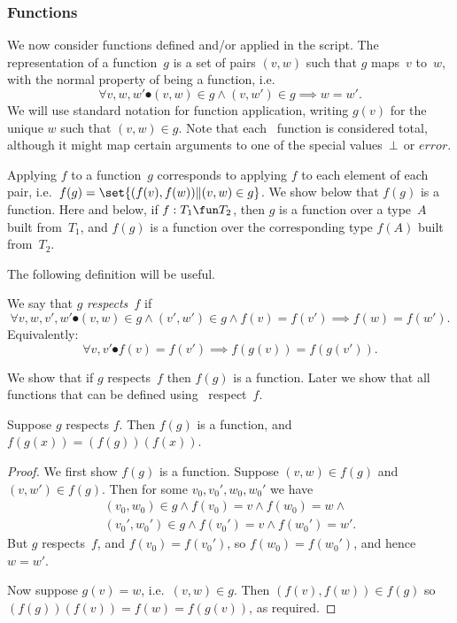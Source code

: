 \subsubsection{Functions}

We now consider functions defined and/or applied in the script.
The representation of a function~$g$ is a set of pairs $(v,w)$ such that $g$
maps~$v$ to~$w$, with the normal property of being a function, i.e.
\[
\forall v, w, w' \spot (v,w) \in g \land (v,w') \in g \implies w=w'.
\]
We will use standard notation for function application, writing $g(v)$ for the
unique $w$ such that $(v,w) \in g$.
%
Note that each \CSPm\ function is considered total, although it might map
certain arguments to one of the special values~$\perp$ or $error$. 

Applying $f$ to a function~$g$ corresponds to applying $f$ to each element of
each pair, i.e.~$f(g) = \set{(f(v), f(w)) \| (v,w) \in g}$.  We show below
that $f(g)$ is a function.  Here and below, if $f: T_1 \fun T_2$, then $g$ is
a function over a type~$A$ built from~$T_1$, and $f(g)$ is a function over the
corresponding type $f(A)$ built from~$T_2$.

The following definition will be useful.
%
\begin{definition}
We say that $g$ \emph{respects~$f$} if
\[
\forall v, w, v', w' \spot 
  (v,w) \in g \land (v',w') \in g \land f(v) = f(v') \implies f(w) = f(w'). 
\]
Equivalently:
\[
\forall v,  v' \spot f(v) = f(v') \implies f(g(v)) = f(g(v')). 
\]
\end{definition}
%
We show that if $g$ respects~$f$ then $f(g)$ is a function.  Later we show
that all functions that can be defined using \CSPm\ respect~$f$. 
%
\begin{lemma}
\label{lem:function-respects}
Suppose $g$ respects $f$.  Then $f(g)$ is a function, and $f(g(x)) =
(f(g))(f(x))$.
\end{lemma}
%
\begin{proof}
We first show $f(g)$ is a function.  Suppose $(v,w) \in f(g)$ and $(v,w') \in
f(g)$.  Then for some $v_0, v_0', w_0, w_0'$ we have
\[
\begin{align}
(v_0,w_0) \in g \land f(v_0) = v \land f(w_0) = w \land \\
(v_0',w_0') \in g \land f(v_0') = v \land f(w_0') = w'.
\end{align}
\]
But $g$ respects~$f$, and $f(v_0) = f(v_0')$, so $f(w_0) = f(w_0')$, and hence
$w = w'$.

Now suppose $g(v) = w$, i.e.~$(v,w) \in g$.  Then $(f(v),f(w)) \in f(g)$ so
$(f(g))(f(v)) = f(w) = f(g(v))$, as required.
\end{proof}

